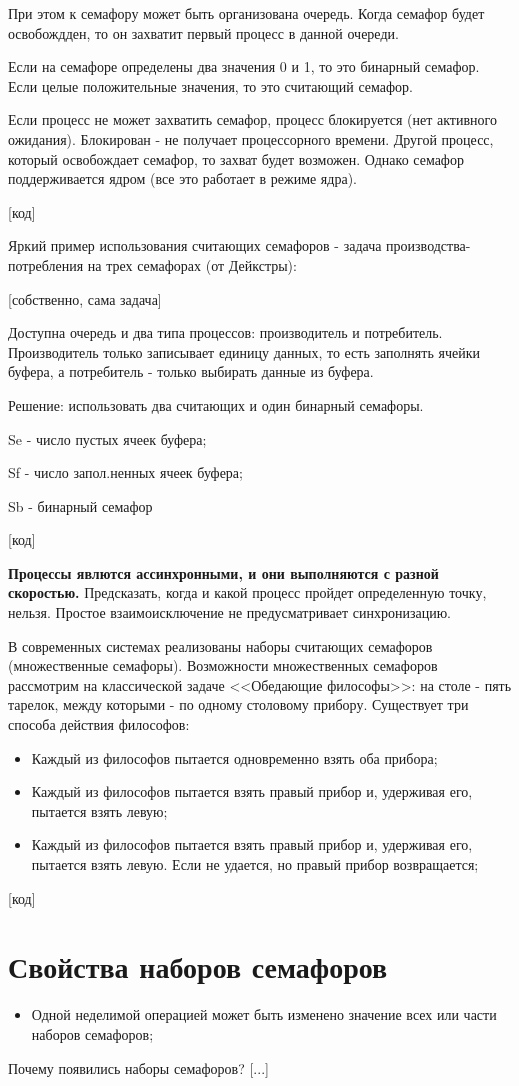 \documentclass[a4paper, 14pt]{report}
\begin{document}
	При этом к семафору может быть организована очередь. Когда семафор будет освобождден, то он захватит первый процесс в данной очереди.
	
	Если на семафоре определены два значения 0 и 1, то это бинарный семафор. Если целые положительные значения, то это считающий семафор.
	
	Если процесс не может захватить семафор, процесс блокируется (нет активного ожидания). Блокирован - не получает процессорного времени. Другой процесс, который освобождает семафор, то захват будет возможен. Однако семафор поддерживается ядром (все это работает в режиме ядра).
	
	[код]
	
	Яркий пример использования считающих семафоров - задача производства-потребления на трех семафорах (от Дейкстры):
	
	[собственно, сама задача]
	
	Доступна очередь и два типа процессов: производитель и потребитель. Производитель только записывает единицу данных, то есть заполнять ячейки буфера, а потребитель - только выбирать данные из буфера.
	
	Решение: использовать два считающих и один бинарный семафоры.
	
	Se - число пустых ячеек буфера;
	
	Sf - число запол.ненных ячеек буфера;
	
	Sb - бинарный семафор
	
	[код]
	
	{\bf Процессы явлются ассинхронными, и они выполняются с разной скоростью.} Предсказать, когда и какой процесс пройдет определенную точку, нельзя. Простое взаимоисключение не предусматривает синхронизацию.
	
	В современных системах реализованы наборы считающих семафоров (множественные семафоры). Возможности множественных семафоров рассмотрим на классической задаче <<Обедающие философы>>: на столе - пять тарелок, между которыми - по одному столовому прибору. Существует три способа действия философов:
	
	\begin{itemize}
		\item Каждый из философов пытается одновременно взять оба прибора;
		\item Каждый из философов пытается взять правый прибор и, удерживая его, пытается взять левую;
		\item Каждый из философов пытается взять правый прибор и, удерживая его, пытается взять левую. Если не удается, но правый прибор возвращается;
	\end{itemize}

	[код]
	
	\section*{Свойства наборов семафоров}
	
	\begin{itemize}
		\item Одной неделимой операцией может быть изменено значение всех или части наборов семафоров;
	\end{itemize}

	Почему появились наборы семафоров? [...]
\end{document}
